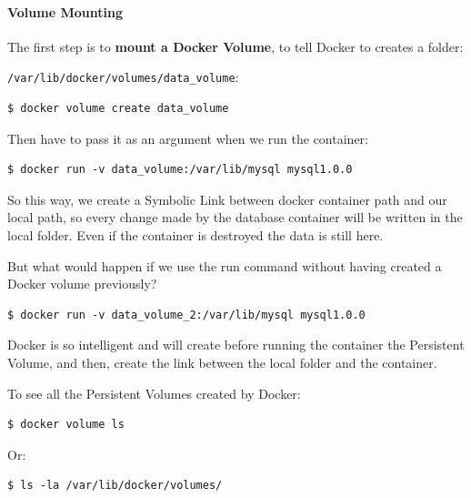 \documentclass{article}
\newenvironment{blocktemplate}[1]{%
    \tcolorbox[beamer,%
    noparskip,breakable,
    colframe=Blue,%
    colbacklower=LimeGreen!75!LightGreen,%
    title=#1]}%
    {\endtcolorbox}
\newenvironment{codetemplate}[1][]{%
  \mybasecolorbox[#1]
  \itshape
}{%
  \endmybasecolorbox
}
\begin{document}
\paragraph{Volume Mounting}

The first step is to \textbf{mount a Docker Volume}, to tell Docker to creates a folder:

\verb|/var/lib/docker/volumes/data_volume|:

\begin{codetemplate}{}
\begin{verbatim}
$ docker volume create data_volume
\end{verbatim}
\end{codetemplate}

Then have to pass it as an argument when we run the container:
\begin{codetemplate}{}
\begin{verbatim}
$ docker run -v data_volume:/var/lib/mysql mysql1.0.0
\end{verbatim}
\end{codetemplate}

So this way, we create a Symbolic Link between docker container path and our local path, so every change made by the database container will be written in the local folder. Even if the container is destroyed the data is still here.

\begin{blocktemplate}{NOTE}
But what would happen if we use the run command without having created a Docker volume previously?
\begin{codetemplate}{}
\begin{verbatim}
$ docker run -v data_volume_2:/var/lib/mysql mysql1.0.0
\end{verbatim}
\end{codetemplate}

Docker is so intelligent and will create before running the container the Persistent Volume, and then, create the link between the local folder and the container.
\end{blocktemplate}

To see all the Persistent Volumes created by Docker:
\begin{codetemplate}{}
\begin{verbatim}
$ docker volume ls
\end{verbatim}
\end{codetemplate}

Or:
\begin{codetemplate}{}
\begin{verbatim}
$ ls -la /var/lib/docker/volumes/
\end{verbatim}
\end{codetemplate}
\end{document}

